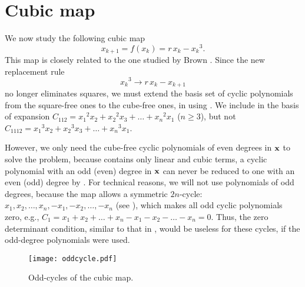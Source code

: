 \documentclass[twocolumn]{revtex4-1}
\begin{document}
\section{\label{sec:cubic}Cubic map}


We now study the following cubic map \cite{strogatz}
\begin{equation}
  x_{k + 1} = f(x_k) = r \, x_k - {x_k}^3.
\label{eq:cubic}
\end{equation}
This map is closely related to the one studied by Brown \cite{brown3}.
Since the new replacement rule
\begin{equation}
  {x_k}^3 \rightarrow r \, x_k - x_{k+1}
\label{eq:cubreplace}
\end{equation}
no longer eliminates squares,
%
we must extend the basis set of cyclic polynomials
  from the square-free ones to the cube-free ones,
  in using .
We include in the basis of expansion
  $C_{112} = {x_1}^2 x_2 + {x_2}^2 x_3 + \dots + {x_n}^2 x_1$ ($n\ge3$),
but not
  $C_{1112} = {x_1}^3 x_2 + {x_2}^3 x_3 + \dots + {x_n}^3 x_1$.

%
However, we only need the cube-free cyclic polynomials of even degrees in $\mathbf{x}$
to solve the problem,
%
because  contains only linear and cubic terms,
a cyclic polynomial with an odd (even) degree in $\mathbf{x}$
can never be reduced to one with an even (odd) degree
by .
%
%
For technical reasons, we will not use polynomials of odd degrees,
because the map allows a symmetric $2n$-cycle:
$x_1, x_2, \ldots, x_n, -x_1, -x_2, \ldots, -x_n$
(see ),
which makes all odd cyclic polynomials zero,
e.g., $C_1 = x_1 + x_2 + \dots + x_n - x_1 - x_2 - \dots - x_n = 0$.
%
Thus, the zero determinant condition, similar to that in ,
  would be useless for these cycles,
  if the odd-degree polynomials were used.



\begin{figure}[h]
  \begin{minipage}{\linewidth}
    \begin{center}
        \texttt{[image: oddcycle.pdf]}
    \end{center}
  \end{minipage}%
  \caption{\label{fig:oddcycle}
  Odd-cycles of the cubic map.}
\end{figure}
\end{document}
